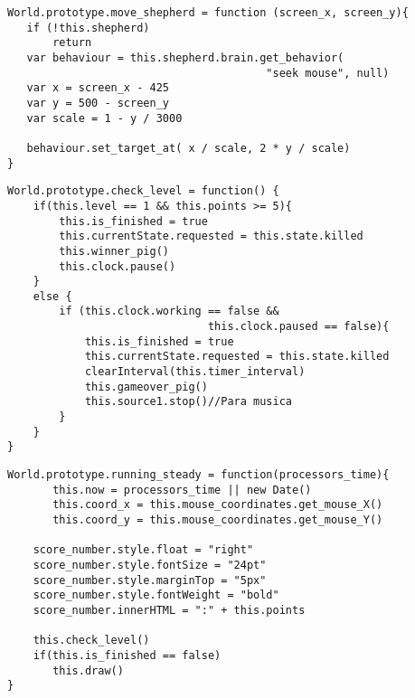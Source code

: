 \begin{lstlisting}[caption=Función move\_shepherd, label={lst:code441}]
World.prototype.move_shepherd = function (screen_x, screen_y){
   if (!this.shepherd)
       return
   var behaviour = this.shepherd.brain.get_behavior(
                                        "seek mouse", null)
   var x = screen_x - 425
   var y = 500 - screen_y
   var scale = 1 - y / 3000

   behaviour.set_target_at( x / scale, 2 * y / scale)
}
\end{lstlisting}


\begin{lstlisting}[caption=Función check\_level, label={lst:code442}]
World.prototype.check_level = function() {
    if(this.level == 1 && this.points >= 5){
        this.is_finished = true
        this.currentState.requested = this.state.killed
        this.winner_pig()
        this.clock.pause()       
    }
    else {
        if (this.clock.working == false && 
                               this.clock.paused == false){
            this.is_finished = true
            this.currentState.requested = this.state.killed
            clearInterval(this.timer_interval)
            this.gameover_pig()
            this.source1.stop()//Para musica        
        }
    }
}
\end{lstlisting}


\begin{lstlisting}[caption=Función running\_steady, label={lst:code443}]
World.prototype.running_steady = function(processors_time){
       this.now = processors_time || new Date()
       this.coord_x = this.mouse_coordinates.get_mouse_X()
       this.coord_y = this.mouse_coordinates.get_mouse_Y()

    score_number.style.float = "right"
    score_number.style.fontSize = "24pt"
    score_number.style.marginTop = "5px"
    score_number.style.fontWeight = "bold"
    score_number.innerHTML = ":" + this.points

    this.check_level()
    if(this.is_finished == false)
       this.draw()
}
\end{lstlisting}



